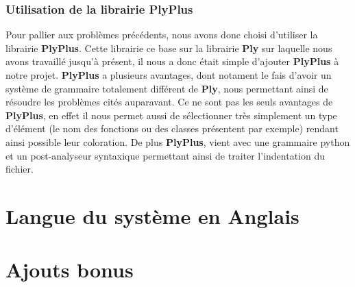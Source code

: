 \documentclass[a4paper,12pt]{article}
\begin{document}
		\subsubsection{Utilisation de la librairie PlyPlus}

			Pour pallier aux problèmes précédents, nous avons donc choisi d'utiliser la librairie \textbf{PlyPlus}. Cette librairie ce base sur la librairie \textbf{Ply} sur laquelle nous avons travaillé jusqu'à présent, il nous a donc était simple d'ajouter \textbf{PlyPlus} à notre projet. \textbf{PlyPlus} a plusieurs avantages, dont notament le fais d'avoir un système de grammaire totalement différent de \textbf{Ply}, nous permettant ainsi de résoudre les problèmes cités auparavant. Ce ne sont pas les seuls avantages de \textbf{PlyPlus}, en effet il nous permet aussi de sélectionner très simplement un type d'élément (le nom des fonctions ou des classes présentent par exemple) rendant ainsi possible leur coloration. De plus \textbf{PlyPlus}, vient avec une grammaire python et un post-analyseur syntaxique permettant ainsi de traiter l'indentation du fichier. 

	
\section{Langue du système en Anglais}

\section{Ajouts bonus}

	
\end{document}
